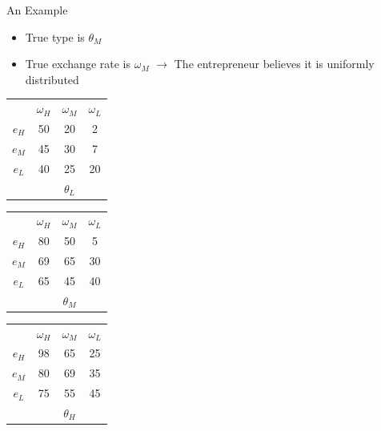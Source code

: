 \documentclass[aspectratio=169]{beamer}
\begin{document}
\begin{frame}{An Example}
\begin{itemize}
    \item True type is $\theta_M$ \\
    \bigskip
    \item True exchange rate is $\omega_M$ $\rightarrow$ The entrepreneur believes it is uniformly distributed\\
    \end{itemize}

    \centering
\begin{tabular}{ c|c|c|c|}
  
  \multicolumn{1}{c}{} & \multicolumn{1}{c}{$\omega_H$} & \multicolumn{1}{c}{$\omega_M$} & \multicolumn{1}{c}{$\omega_L$}\\
  \cline{2-4}
  $e_H$ & 50 & 20 & 2 \\
  \cline{2-4}
  $e_M$ & 45 & 30 & 7 \\
  \cline{2-4}
  $e_L$ & 40 & 25 & 20 \\
  \cline{2-4}
  \multicolumn{1}{c}{} & \multicolumn{1}{c}{} & \multicolumn{1}{c}{$\theta_L$} & \multicolumn{1}{c}{}\\
\end{tabular}
\hspace{.3cm} %
\begin{tabular}{ c|c|c|c|}
  
  \multicolumn{1}{c}{} & \multicolumn{1}{c}{$\omega_H$} & \multicolumn{1}{c}{$\omega_M$} & \multicolumn{1}{c}{$\omega_L$}\\
  \cline{2-4}
  $e_H$ & 80 & \cellcolor{blue!25}50 & 5 \\
  \cline{2-4}
  $e_M$ & 69 & \cellcolor{blue!25}65 & 30 \\
  \cline{2-4}
  $e_L$ & 65 & \cellcolor{blue!25}45 & 40 \\
  \cline{2-4}
  \multicolumn{1}{c}{} & \multicolumn{1}{c}{} & \multicolumn{1}{c}{$\theta_M$} & \multicolumn{1}{c}{}\\
\end{tabular}
\hspace{.3cm} %
\begin{tabular}{ c|c|c|c|}
  
  \multicolumn{1}{c}{} & \multicolumn{1}{c}{$\omega_H$} & \multicolumn{1}{c}{$\omega_M$} & \multicolumn{1}{c}{$\omega_L$}\\
  \cline{2-4}
  $e_H$ & 98 & 65 & 25 \\
  \cline{2-4}
  $e_M$ & 80 & 69 & 35 \\
  \cline{2-4}
  $e_L$ & 75 & 55 & 45 \\
  \cline{2-4}
  \multicolumn{1}{c}{} & \multicolumn{1}{c}{} & \multicolumn{1}{c}{$\theta_H$} & \multicolumn{1}{c}{}\\
\end{tabular}
    
\end{frame}
\end{document}
